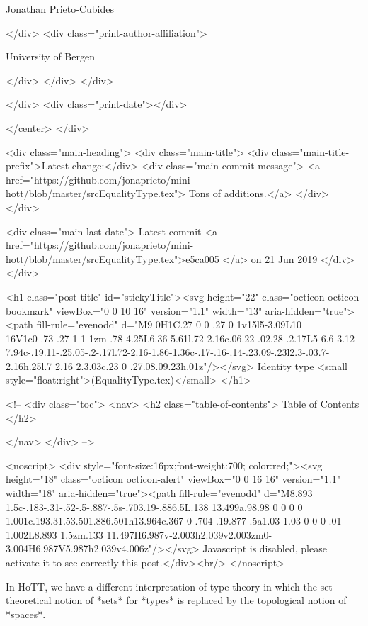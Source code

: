                   Jonathan Prieto-Cubides
                
              </div>
              <div class="print-author-affiliation">
                
                  University of Bergen
                
                </div>
            </div>
          </div>
          
          
        </div>
        <div class="print-date"></div>
        
        
    </center>
  </div>

  
  <div class="main-heading">
    <div class="main-title">
      <div class="main-title-prefix">Latest change:</div>
      <div class="main-commit-message">
            <a href="https://github.com/jonaprieto/mini-hott/blob/master/srcEqualityType.tex">
              Tons of additions.</a>
      </div>
    </div>

    <div class="main-last-date">
      Latest commit <a href="https://github.com/jonaprieto/mini-hott/blob/master/srcEqualityType.tex">e5ca005 </a> on  21 Jun 2019
    </div>
  </div>
  

  <h1 class="post-title" id="stickyTitle"><svg height="22" class="octicon octicon-bookmark" viewBox="0 0 10 16" version="1.1" width="13" aria-hidden="true"><path fill-rule="evenodd" d="M9 0H1C.27 0 0 .27 0 1v15l5-3.09L10 16V1c0-.73-.27-1-1-1zm-.78 4.25L6.36 5.61l.72 2.16c.06.22-.02.28-.2.17L5 6.6 3.12 7.94c-.19.11-.25.05-.2-.17l.72-2.16-1.86-1.36c-.17-.16-.14-.23.09-.23l2.3-.03.7-2.16h.25l.7 2.16 2.3.03c.23 0 .27.08.09.23h.01z"/></svg> Identity type <small style="float:right">(EqualityType.tex)</small>
  </h1>

  <!-- 
  <div class="toc">
    <nav>
    <h2 class="table-of-contents"> Table of Contents </h2>
      

    </nav>
  </div>
   -->

  <noscript>
  <div style="font-size:16px;font-weight:700; color:red;"><svg height="18" class="octicon octicon-alert" viewBox="0 0 16 16" version="1.1" width="18" aria-hidden="true"><path fill-rule="evenodd" d="M8.893 1.5c-.183-.31-.52-.5-.887-.5s-.703.19-.886.5L.138 13.499a.98.98 0 0 0 0 1.001c.193.31.53.501.886.501h13.964c.367 0 .704-.19.877-.5a1.03 1.03 0 0 0 .01-1.002L8.893 1.5zm.133 11.497H6.987v-2.003h2.039v2.003zm0-3.004H6.987V5.987h2.039v4.006z"/></svg> Javascript is disabled, please activate it to see correctly this post.</div><br/>
  </noscript>

  In HoTT, we have a different interpretation of type theory in which the
set-theoretical notion of *sets* for *types* is replaced by the topological
notion of *spaces*.

